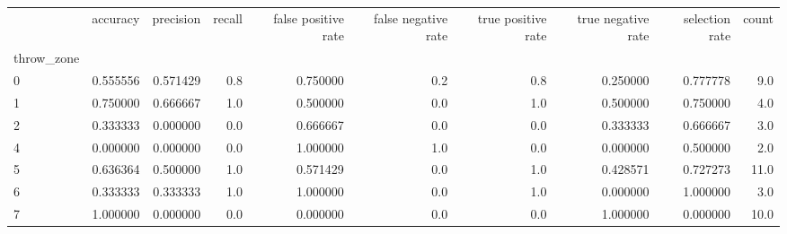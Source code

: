\begin{tabular}{lrrrrrrrrr}
\toprule
{} &  accuracy &  precision &  recall &  false positive rate &  false negative rate &  true positive rate &  true negative rate &  selection rate &  count \\
throw\_zone &           &            &         &                      &                      &                     &                     &                 &        \\
\midrule
0          &  0.555556 &   0.571429 &     0.8 &             0.750000 &                  0.2 &                 0.8 &            0.250000 &        0.777778 &    9.0 \\
1          &  0.750000 &   0.666667 &     1.0 &             0.500000 &                  0.0 &                 1.0 &            0.500000 &        0.750000 &    4.0 \\
2          &  0.333333 &   0.000000 &     0.0 &             0.666667 &                  0.0 &                 0.0 &            0.333333 &        0.666667 &    3.0 \\
4          &  0.000000 &   0.000000 &     0.0 &             1.000000 &                  1.0 &                 0.0 &            0.000000 &        0.500000 &    2.0 \\
5          &  0.636364 &   0.500000 &     1.0 &             0.571429 &                  0.0 &                 1.0 &            0.428571 &        0.727273 &   11.0 \\
6          &  0.333333 &   0.333333 &     1.0 &             1.000000 &                  0.0 &                 1.0 &            0.000000 &        1.000000 &    3.0 \\
7          &  1.000000 &   0.000000 &     0.0 &             0.000000 &                  0.0 &                 0.0 &            1.000000 &        0.000000 &   10.0 \\
\bottomrule
\end{tabular}
